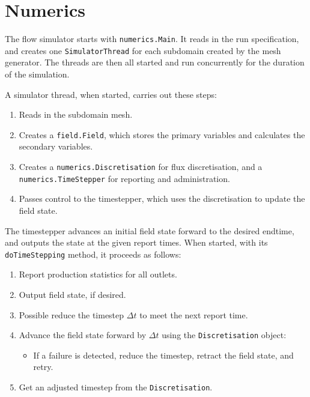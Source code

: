 \chapter{Numerics}
\label{chap:numerics}

\minitoc

The flow simulator starts with \texttt{numerics.Main}. It reads in the
run specification, and creates one \texttt{SimulatorThread} for each
subdomain created by the mesh generator. The threads are then all
started and run concurrently for the duration of the simulation.

A simulator thread, when started, carries out these steps:
\begin{enumerate}
\item Reads in the subdomain mesh.
\item Creates a \texttt{field.Field}, which stores the primary
  variables and calculates the secondary variables.
\item Creates a \texttt{numerics.Discretisation} for flux
  discretisation, and a \texttt{numerics.TimeStepper} for reporting
  and administration.
\item Passes control to the timestepper, which uses the discretisation
  to update the field state.
\end{enumerate}



The timestepper advances an initial field state forward to the desired
endtime, and outputs the state at the given report times. When
started, with its \texttt{doTimeStepping} method, it proceeds as
follows:
\begin{enumerate}
\item Report production statistics for all outlets.
\item Output field state, if desired.
\item Possible reduce the timestep $\Delta t$ to meet the next report
  time.
\item Advance the field state forward by $\Delta t$ using the
  \texttt{Discretisation} object:
  \begin{itemize}
  \item If a failure is detected, reduce the timestep, retract the
    field state, and retry.
  \end{itemize}
\item Get an adjusted timestep from the \texttt{Discretisation}.
\end{enumerate}

